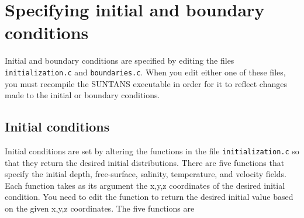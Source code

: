 \section{Specifying initial and boundary conditions} 

Initial and boundary conditions are specified by editing the files \verb+initialization.c+ and \verb+boundaries.c+.  When you
edit either one of these files, you must recompile the SUNTANS executable in order for it to reflect changes made
to the initial or boundary conditions.

\subsection{Initial conditions}

Initial conditions are set by altering the functions in the file \verb+initialization.c+ so that they return the
desired initial distributions.  There are five functions that specify the initial depth, free-surface,
salinity, temperature, and velocity fields.  Each function takes as its argument the x,y,z coordinates of
the desired initial condition.  You need to edit the function to return the desired initial value based on the
given x,y,z coordinates.  The five functions are
